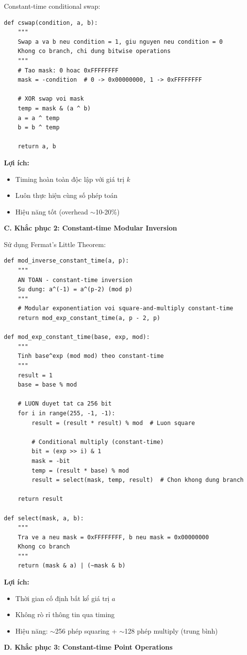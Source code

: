 Constant-time conditional swap:

\begin{verbatim}
def cswap(condition, a, b):
    """
    Swap a va b neu condition = 1, giu nguyen neu condition = 0
    Khong co branch, chi dung bitwise operations
    """
    # Tao mask: 0 hoac 0xFFFFFFFF
    mask = -condition  # 0 -> 0x00000000, 1 -> 0xFFFFFFFF
    
    # XOR swap voi mask
    temp = mask & (a ^ b)
    a = a ^ temp
    b = b ^ temp
    
    return a, b
\end{verbatim}

\textbf{Lợi ích:}
\begin{itemize}
    \item Timing hoàn toàn độc lập với giá trị $k$
    \item Luôn thực hiện cùng số phép toán
    \item Hiệu năng tốt (overhead $\sim$10-20\%)
\end{itemize}
\textbf{C. Khắc phục 2: Constant-time Modular Inversion}

Sử dụng Fermat's Little Theorem:

\begin{verbatim}
def mod_inverse_constant_time(a, p):
    """
    AN TOAN - constant-time inversion
    Su dung: a^(-1) = a^(p-2) (mod p)
    """
    # Modular exponentiation voi square-and-multiply constant-time
    return mod_exp_constant_time(a, p - 2, p)

def mod_exp_constant_time(base, exp, mod):
    """
    Tinh base^exp (mod mod) theo constant-time
    """
    result = 1
    base = base % mod
    
    # LUON duyet tat ca 256 bit
    for i in range(255, -1, -1):
        result = (result * result) % mod  # Luon square
        
        # Conditional multiply (constant-time)
        bit = (exp >> i) & 1
        mask = -bit
        temp = (result * base) % mod
        result = select(mask, temp, result)  # Chon khong dung branch
    
    return result

def select(mask, a, b):
    """
    Tra ve a neu mask = 0xFFFFFFFF, b neu mask = 0x00000000
    Khong co branch
    """
    return (mask & a) | (~mask & b)
\end{verbatim}

\textbf{Lợi ích:}
\begin{itemize}
    \item Thời gian cố định bất kể giá trị $a$
    \item Không rò rỉ thông tin qua timing
    \item Hiệu năng: $\sim$256 phép squaring + $\sim$128 phép multiply (trung bình)
\end{itemize}
\textbf{D. Khắc phục 3: Constant-time Point Operations}


